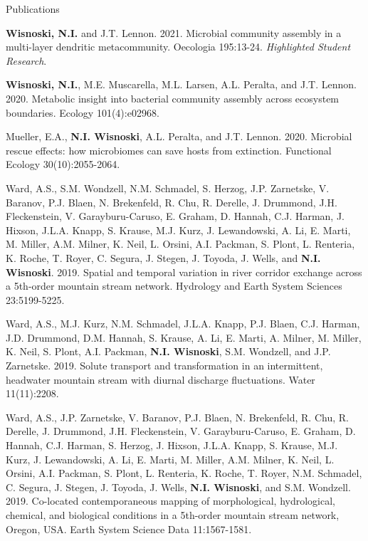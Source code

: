 \documentclass{resume} %
\begin{document}
\begin{rSection}{Publications}
\begin{etaremune}
\item {\bf Wisnoski, N.I.} and J.T. Lennon. 2021. Microbial community assembly in a multi-layer dendritic metacommunity. Oecologia 195:13-24. {\em Highlighted Student Research}.

\item {\bf Wisnoski, N.I.}, M.E. Muscarella, M.L. Larsen, A.L. Peralta, and J.T. Lennon. 2020. Metabolic insight into bacterial community assembly across ecosystem boundaries. Ecology 101(4):e02968.

\item Mueller, E.A., {\bf N.I. Wisnoski}, A.L. Peralta, and J.T. Lennon. 2020. Microbial rescue effects: how microbiomes can save hosts from extinction. Functional Ecology 30(10):2055-2064.

\item Ward, A.S., S.M. Wondzell, N.M. Schmadel, S. Herzog, J.P. Zarnetske, V. Baranov, P.J. Blaen, N. Brekenfeld, R. Chu, R. Derelle, J. Drummond, J.H. Fleckenstein, V. Garayburu-Caruso, E. Graham, D. Hannah, C.J. Harman, J. Hixson, J.L.A. Knapp, S. Krause, M.J. Kurz, J. Lewandowski, A. Li, E. Marti, M. Miller, A.M. Milner, K. Neil, L. Orsini, A.I. Packman, S. Plont, L. Renteria, K. Roche, T. Royer, C. Segura, J. Stegen, J. Toyoda, J. Wells, and {\bf N.I. Wisnoski}. 2019. Spatial and temporal variation in river corridor exchange across a 5th-order mountain stream network. Hydrology and Earth System Sciences 23:5199-5225.

\item Ward, A.S., M.J. Kurz, N.M. Schmadel, J.L.A. Knapp, P.J. Blaen, C.J. Harman, J.D. Drummond, D.M. Hannah, S. Krause, A. Li, E. Marti, A. Milner, M. Miller, K. Neil, S. Plont, A.I. Packman, {\bf N.I. Wisnoski}, S.M. Wondzell, and J.P. Zarnetske. 2019. Solute transport and transformation in an intermittent, headwater mountain stream with diurnal discharge fluctuations. Water 11(11):2208.

\item Ward, A.S., J.P. Zarnetske, V. Baranov, P.J. Blaen, N. Brekenfeld, R. Chu, R. Derelle, J. Drummond, J.H. Fleckenstein, V. Garayburu-Caruso, E. Graham, D. Hannah, C.J. Harman, S. Herzog, J. Hixson, J.L.A. Knapp, S. Krause, M.J. Kurz, J. Lewandowski, A. Li, E. Marti, M. Miller, A.M. Milner, K. Neil, L. Orsini, A.I. Packman, S. Plont, L. Renteria, K. Roche, T. Royer, N.M. Schmadel, C. Segura, J. Stegen, J. Toyoda, J. Wells, {\bf N.I. Wisnoski}, and S.M. Wondzell. 2019. Co-located contemporaneous mapping of morphological, hydrological, chemical, and biological conditions in a 5th-order mountain stream network, Oregon, USA. Earth System Science Data 11:1567-1581.


\end{etaremune}
\end{rSection}
\end{document}
